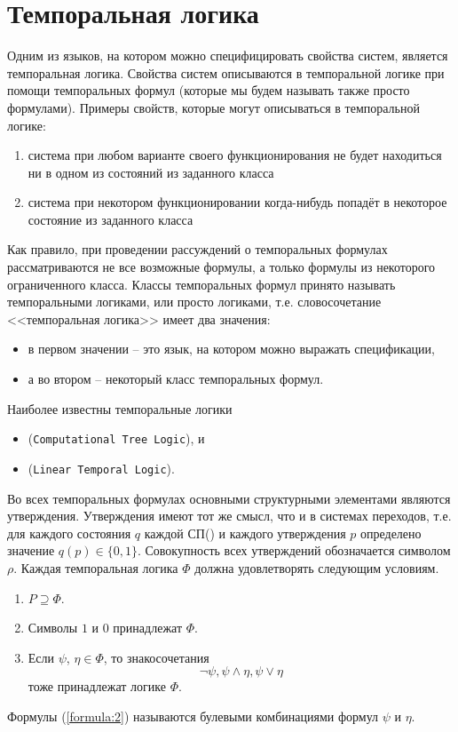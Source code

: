 \documentclass[12pt, twoside]{report}
\begin{document}
\section*{Темпоральная логика}\label{temporal_LOGIC}

Одним из языков, на котором можно специфицировать свойства
систем, является темпоральная логика\cite{Mironov:ModelChecking}.
Свойства систем описываются в темпоральной логике при помощи темпоральных формул
(которые мы будем называть также просто формулами). Примеры свойств, которые могут
описываться в темпоральной логике:
\begin{enumerate}
  \item система при любом варианте своего функционирования не будет находиться ни в одном из состояний из заданного класса
  \item система при некотором функционировании когда-нибудь попадёт в некоторое состояние из заданного класса
\end{enumerate}
Как правило, при проведении рассуждений о темпоральных формулах рассматриваются не все возможные
формулы, а только формулы из некоторого ограниченного класса. Классы темпоральных формул принято
называть темпоральными логиками, или просто логиками, т.е. словосочетание <<темпоральная логика>> имеет два значения:
\begin{itemize}
  \item в первом значении – это язык, на котором можно выражать спецификации,
  \item а во втором – некоторый класс темпоральных формул.
\end{itemize}
Наиболее известны темпоральные логики
\begin{itemize}
  \item {} (\texttt{Computational Tree Logic}), и
  \item {} (\texttt{Linear Temporal Logic}).
\end{itemize}
Во всех темпоральных формулах основными структурными элементами являются утверждения.
Утверждения имеют тот же смысл, что и в системах переходов, т.е. для каждого состояния
$q$ каждой СП() и каждого утверждения $p$ определено значение $q(p) \in \{0, 1\}$.
Совокупность всех утверждений обозначается символом $\rho$. Каждая темпоральная логика $\Phi$
должна удовлетворять следующим условиям.
\begin{enumerate}
  \item $P \supseteq \Phi$.
  \item Символы $1$ и $0$ принадлежат $\Phi$.
  \item Если $\psi$, $\eta \in \Phi$, то знакосочетания
    \begin{equation}\label{formula:2}
      \neg\psi, \psi \wedge \eta, \psi \vee \eta
    \end{equation}
    тоже принадлежат логике $\Phi$.
\end{enumerate}
Формулы (\ref{formula:2}) называются булевыми комбинациями формул $\psi$ и $\eta$.
\end{document}

